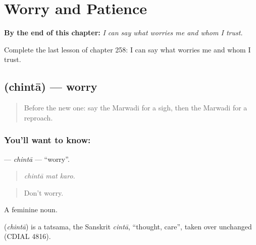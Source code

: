 
\chapter{Worry and Patience}
\label{ch:mw-worry-and-patience}

\begin{chapteropening}
\textbf{By the end of this chapter:} \emph{I can say what worries me and whom I trust.}

Complete the last lesson of chapter 258: I can say what worries me and whom I trust.
\end{chapteropening}

\section[\texorpdfstring{\mw{चिंता} (chintā)}{चिंता (chintā)}]{ (chintā) — worry}

\label{lesson:MW-C258-chinta}



\begin{quote}
Before the new one: say the Marwadi for a sigh, then the Marwadi for a reproach.
\end{quote}

\subsection*{You'll want to know: }
\textbf{} — \emph{chintā} — \textquotedblleft{}worry\textquotedblright{}.

\begin{quote}
  
\end{quote}

\begin{quote}
\emph{chintā mat karo.}
\end{quote}

\begin{quote}
Don't worry.
\end{quote}

A feminine noun.

\begin{cousinweb}
\textbf{} (\emph{chintā}) is a tatsama, the Sanskrit \emph{cintā}, \textquotedblleft{}thought, care\textquotedblright{}, taken over unchanged (CDIAL 4816).
\end{cousinweb}

